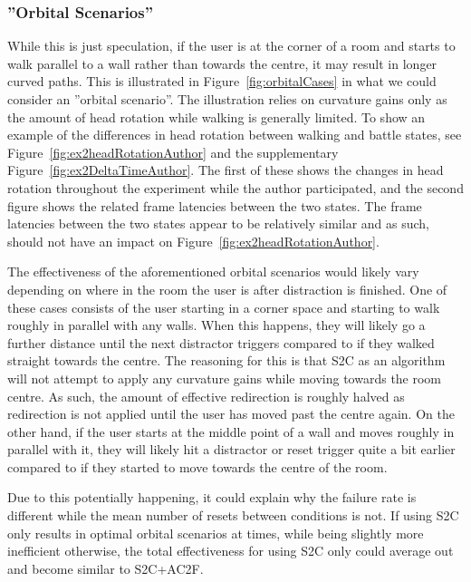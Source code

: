 \subsubsection{''Orbital Scenarios''}
While this is just speculation, if the user is at the corner of a room and starts to walk parallel to a wall rather than towards the centre, it may result in longer curved paths. This is illustrated in Figure~\ref{fig:orbitalCases} in what we could consider an ''orbital scenario''. The illustration relies on curvature gains only as the amount of head rotation while walking is generally limited. To show an example of the differences in head rotation between walking and battle states, see Figure~\ref{fig:ex2headRotationAuthor} and the supplementary Figure~\ref{fig:ex2DeltaTimeAuthor}. The first of these shows the changes in head rotation throughout the experiment while the author participated, and the second figure shows the related frame latencies between the two states. The frame latencies between the two states appear to be relatively similar and as such, should not have an impact on Figure~\ref{fig:ex2headRotationAuthor}.

The effectiveness of the aforementioned orbital scenarios would likely vary depending on where in the room the user is after distraction is finished. One of these cases consists of the user starting in a corner space and starting to walk roughly in parallel with any walls. When this happens, they will likely go a further distance until the next distractor triggers compared to if they walked straight towards the centre. The reasoning for this is that S2C as an algorithm will not attempt to apply any curvature gains while moving towards the room centre. As such, the amount of effective redirection is roughly halved as redirection is not applied until the user has moved past the centre again. On the other hand, if the user starts at the middle point of a wall and moves roughly in parallel with it, they will likely hit a distractor or reset trigger quite a bit earlier compared to if they started to move towards the centre of the room.  

Due to this potentially happening, it could explain why the failure rate is different while the mean number of resets between conditions is not. If using S2C only results in optimal orbital scenarios at times, while being slightly more inefficient otherwise, the total effectiveness for using S2C only could average out and become similar to S2C+AC2F.

